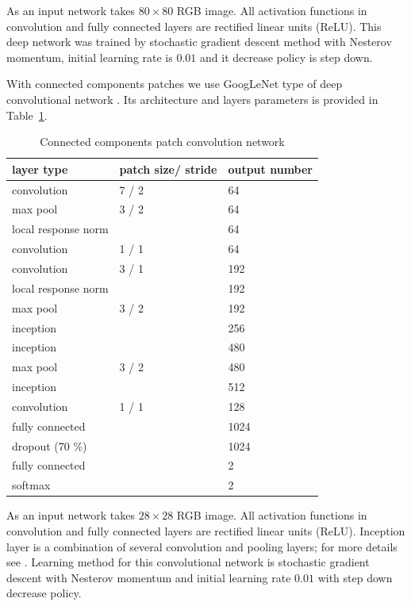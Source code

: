 \documentclass[conference,a4paper,twocolumn]{IEEEtran}
\begin{document}
As an input network takes $80\times80$ RGB image. All activation functions in convolution and fully connected layers are rectified linear units (ReLU). This deep network was trained by stochastic gradient descent method with Nesterov momentum, initial learning rate is $0.01$ and it decrease policy is step down.

With connected components patches we use GoogLeNet type of deep convolutional network \cite{Googlenet}. Its architecture and layers parameters is provided in Table~\ref{googlenet_tab}.
\begin{table}[!t]
\centering
\caption{Connected components patch convolution network}
\label{googlenet_tab}
\begin{tabular}{|l|p{1.3cm}|p{1.3cm}|}
\hline
\textbf{layer type} & \textbf{patch size/ stride} & \textbf{output number}  \\
\hline
convolution & 7 / 2 & 64 \\
\hline
max pool & 3 / 2 & 64 \\
\hline
local response norm & & 64 \\
\hline
convolution & 1 / 1 & 64 \\
\hline
convolution & 3 / 1 & 192 \\
\hline
local response norm & & 192 \\
\hline
max pool & 3 / 2 & 192 \\
\hline
inception &  & 256 \\
\hline
inception &  & 480 \\
\hline
max pool & 3 / 2 & 480 \\
\hline
inception &  & 512 \\
\hline
convolution & 1 / 1 & 128 \\
\hline
fully connected & & 1024 \\
\hline
dropout (70 \%) & & 1024 \\
\hline
fully connected & & 2 \\
\hline
softmax & & 2 \\
\hline
\end{tabular}
\end{table}

As an input network takes $28\times28$ RGB image. All activation functions in convolution and fully connected layers are rectified linear units (ReLU). Inception layer is a combination of several convolution and pooling layers; for more details see \cite{Googlenet}. Learning method for this convolutional network is stochastic gradient descent with Nesterov momentum and initial learning rate $0.01$ with step down decrease policy. 
\end{document}
